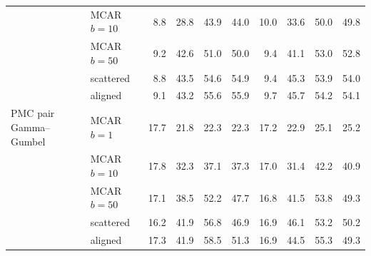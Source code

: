 \begin{table}[htbp]
\begin{tabular}{llrrrrrrrr}
     & MCAR $b{=}10$ & 8.8 & 28.8 & 43.9 & 44.0 & 10.0 & 33.6 & 50.0 & 49.8 \\
     & MCAR $b{=}50$ & 9.2 & 42.6 & 51.0 & 50.0 & 9.4 & 41.1 & 53.0 & 52.8 \\
     & scattered & 8.8 & 43.5 & 54.6 & 54.9 & 9.4 & 45.3 & 53.9 & 54.0 \\
     & aligned & 9.1 & 43.2 & 55.6 & 55.9 & 9.7 & 45.7 & 54.2 & 54.1 \\
    \addlinespace
    PMC pair Gamma--Gumbel & MCAR $b{=}1$ & 17.7 & 21.8 & 22.3 & 22.3 & 17.2 & 22.9 & 25.1 & 25.2 \\
     & MCAR $b{=}10$ & 17.8 & 32.3 & 37.1 & 37.3 & 17.0 & 31.4 & 42.2 & 40.9 \\
     & MCAR $b{=}50$ & 17.1 & 38.5 & 52.2 & 47.7 & 16.8 & 41.5 & 53.8 & 49.3 \\
     & scattered & 16.2 & 41.9 & 56.8 & 46.9 & 16.9 & 46.1 & 53.2 & 50.2 \\
     & aligned & 17.3 & 41.9 & 58.5 & 51.3 & 16.9 & 44.5 & 55.3 & 49.3 \\
    \bottomrule
  \end{tabular}
\end{table}
